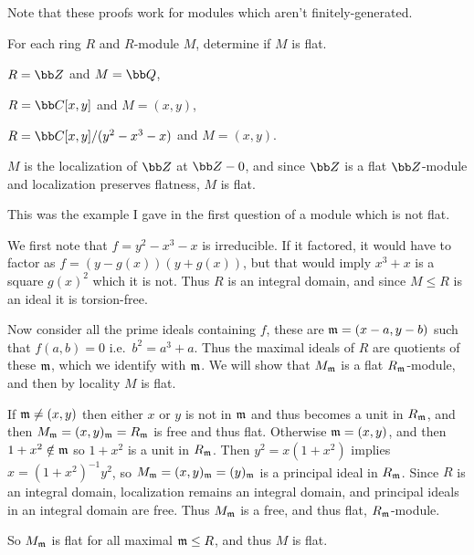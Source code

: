     Note that these proofs work for modules which aren't finitely-generated.
\eenum

\bprob

    For each ring $R$ and $R$-module $M$, determine if $M$ is flat.
    \benum
        \item $R=\bZ$ and $M=\bQ$,
        \item $R=\bC[x,y]$ and $M=(x,y)$,
        \item $R=\bC[x,y]/(y^2-x^3-x)$ and $M=(x,y)$.
    \eenum

\eprob

\benum
    \item $M$ is the localization of $\bZ$ at $\bZ-0$, and since $\bZ$ is a flat $\bZ$-module and localization preserves flatness, $M$ is flat.

    \item This was the example I gave in the first question of a module which is not flat.

    \item We first note that $f=y^2-x^3-x$ is irreducible.
    If it factored, it would have to factor as $f=(y-g(x))(y+g(x))$, but that would imply $x^3+x$ is a square $g(x)^2$ which it is not.
    Thus $R$ is an integral domain, and since $M\leq R$ is an ideal it is torsion-free.

    Now consider all the prime ideals containing $f$, these are ${{\frak m}}=(x-a,y-b)$ such that $f(a,b)=0$ i.e.\ $b^2=a^3+a$.
    Thus the maximal ideals of $R$ are quotients of these ${{\frak m}}$, which we identify with ${{\frak m}}$.
    We will show that $M_{{\frak m}}$ is a flat $R_{{\frak m}}$-module, and then by locality $M$ is flat.

    If ${{\frak m}}\neq(x,y)$ then either $x$ or $y$ is not in ${{\frak m}}$ and thus becomes a unit in $R_{{\frak m}}$, and then $M_{{\frak m}}=(x,y)_{{\frak m}}=R_{{\frak m}}$ is free and thus flat.
    Otherwise ${{\frak m}}=(x,y)$, and then $1+x^2\notin{{\frak m}}$ so $1+x^2$ is a unit in $R_{{\frak m}}$.
    Then $y^2=x(1+x^2)$ implies $x=(1+x^2)^{-1}y^2$, so $M_{{\frak m}}=(x,y)_{{\frak m}}=(y)_{{\frak m}}$ is a principal ideal in $R_{{\frak m}}$.
    Since $R$ is an integral domain, localization remains an integral domain, and principal ideals in an integral domain are free.
    Thus $M_{{\frak m}}$ is a free, and thus flat, $R_{{\frak m}}$-module.

    So $M_{{\frak m}}$ is flat for all maximal ${{\frak m}}\leq R$, and thus $M$ is flat.
\eenum

\bprob

